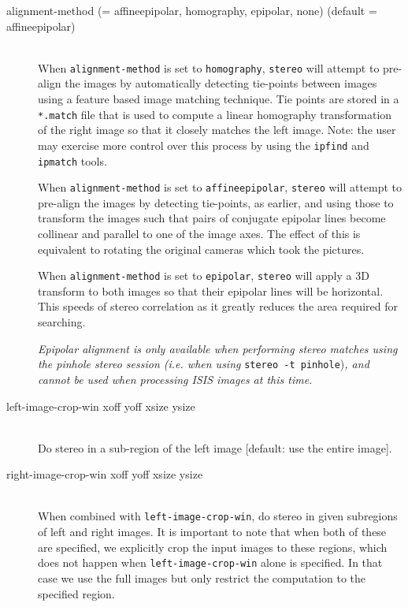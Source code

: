 \begin{description}

\item[alignment-method \textnormal{\small{(= affineepipolar, homography,
      epipolar, none)}} (default = affineepipolar)] \hfill \\

  When \texttt{alignment-method} is set to \texttt{homography},
  \texttt{stereo} will attempt to pre-align the images by
  automatically detecting tie-points between images using a feature
  based image matching technique. Tie points are stored in a
  \texttt{*.match} file that is used to compute a linear homography
  transformation of the right image so that it closely matches the
  left image.  Note: the user may exercise more control over this
  process by using the \texttt{ipfind} and \texttt{ipmatch} tools.

  When \texttt{alignment-method} is set to \texttt{affineepipolar},
  \texttt{stereo} will attempt to pre-align the images by detecting
  tie-points, as earlier, and using those to transform the images such
  that pairs of conjugate epipolar lines become collinear and parallel to
  one of the image axes.  The effect of this is equivalent to rotating the
  original cameras which took the pictures.

  When \texttt{alignment-method} is set to \texttt{epipolar},
  \texttt{stereo} will apply a 3D transform to both images so that
  their epipolar lines will be horizontal. This speeds of stereo
  correlation as it greatly reduces the area required for searching.

  {\em Epipolar alignment is only available when performing stereo
    matches using the pinhole stereo session (i.e. when using}
  \texttt{stereo -t pinhole}){\em, and cannot be used when processing
    ISIS images at this time.}

\item[left-image-crop-win \textnormal xoff yoff xsize ysize] \hfill \\
Do stereo in a sub-region of the left image [default: use the entire image].

\item[right-image-crop-win \textnormal xoff yoff xsize ysize] \hfill \\
When combined with \texttt{left-image-crop-win}, do stereo in given subregions
of left and right images. It is important to note that when both of these
are specified, we explicitly crop the input images to these regions,
which does not happen when \texttt{left-image-crop-win} alone is specified.
In that case we use the full images but only restrict the computation
to the specified region.


\end{description}
